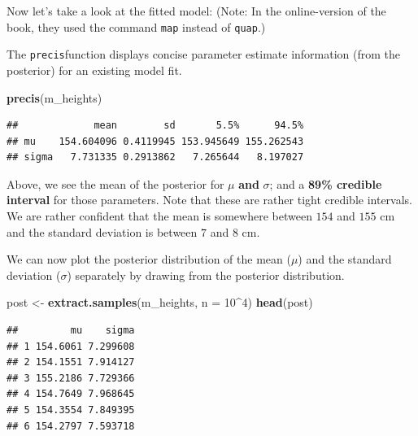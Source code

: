 \documentclass[
]{book}
\newenvironment{Shaded}{\begin{snugshade}}{\end{snugshade}}
\newcommand{\AttributeTok}[1]{\textcolor[rgb]{0.13,0.29,0.53}{#1}}
\newcommand{\DecValTok}[1]{\textcolor[rgb]{0.00,0.00,0.81}{#1}}
\newcommand{\FunctionTok}[1]{\textcolor[rgb]{0.13,0.29,0.53}{\textbf{#1}}}
\newcommand{\NormalTok}[1]{#1}
\newcommand{\OtherTok}[1]{\textcolor[rgb]{0.56,0.35,0.01}{#1}}
\newcommand{\SpecialCharTok}[1]{\textcolor[rgb]{0.81,0.36,0.00}{\textbf{#1}}}
\begin{document}
Now let's take a look at the fitted model:
(Note: In the online-version of the book, they used the command \texttt{map} instead of \texttt{quap}.)

The \texttt{precis}function displays concise parameter estimate information
(from the posterior) for an existing model fit.

\begin{Shaded}
\begin{Highlighting}[]
\FunctionTok{precis}\NormalTok{(m\_heights)}
\end{Highlighting}
\end{Shaded}

\begin{verbatim}
##             mean        sd       5.5%      94.5%
## mu    154.604096 0.4119945 153.945649 155.262543
## sigma   7.731335 0.2913862   7.265644   8.197027
\end{verbatim}

Above, we see the mean of the posterior for \(\mu\) \textbf{and} \(\sigma\);
and a \textbf{89\% credible interval} for those parameters.
Note that these are rather tight credible intervals. We are rather confident that the mean is somewhere between
\(154\) and \(155\) cm and the standard deviation is between \(7\) and \(8\) cm.

We can now plot the posterior distribution of the mean (\(\mu\)) and the standard
deviation (\(\sigma\)) separately by drawing from the posterior distribution.

\begin{Shaded}
\begin{Highlighting}[]
\NormalTok{post }\OtherTok{\textless{}{-}} \FunctionTok{extract.samples}\NormalTok{(m\_heights, }\AttributeTok{n =} \DecValTok{10}\SpecialCharTok{\^{}}\DecValTok{4}\NormalTok{)}
\FunctionTok{head}\NormalTok{(post)}
\end{Highlighting}
\end{Shaded}

\begin{verbatim}
##         mu    sigma
## 1 154.6061 7.299608
## 2 154.1551 7.914127
## 3 155.2186 7.729366
## 4 154.7649 7.968645
## 5 154.3554 7.849395
## 6 154.2797 7.593718
\end{verbatim}

\begin{Shaded}
\end{Shaded}
\end{document}
